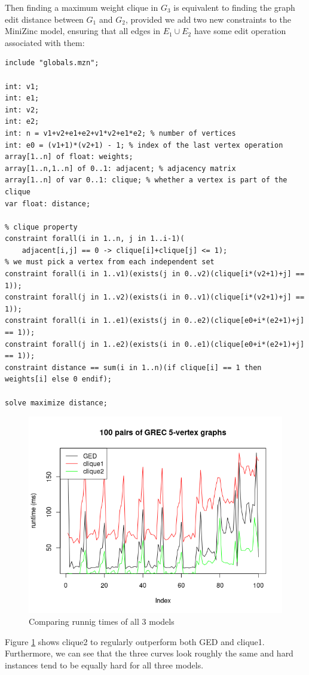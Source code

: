 \documentclass{article}
\theoremstyle{definition}
\begin{document}
Then finding a maximum weight clique in $G_3$ is equivalent to finding the graph edit distance between $G_1$ and $G_2$, provided we add two new constraints to the MiniZinc model, ensuring that all edges in $E_1 \cup E_2$ have some edit operation associated with them:
\begin{lstlisting}
include "globals.mzn";

int: v1;
int: e1;
int: v2;
int: e2;
int: n = v1+v2+e1+e2+v1*v2+e1*e2; % number of vertices
int: e0 = (v1+1)*(v2+1) - 1; % index of the last vertex operation
array[1..n] of float: weights;
array[1..n,1..n] of 0..1: adjacent; % adjacency matrix
array[1..n] of var 0..1: clique; % whether a vertex is part of the clique
var float: distance;

% clique property
constraint forall(i in 1..n, j in 1..i-1)(
    adjacent[i,j] == 0 -> clique[i]+clique[j] <= 1);
% we must pick a vertex from each independent set
constraint forall(i in 1..v1)(exists(j in 0..v2)(clique[i*(v2+1)+j] == 1));
constraint forall(j in 1..v2)(exists(i in 0..v1)(clique[i*(v2+1)+j] == 1));
constraint forall(i in 1..e1)(exists(j in 0..e2)(clique[e0+i*(e2+1)+j] == 1));
constraint forall(j in 1..e2)(exists(i in 0..e1)(clique[e0+i*(e2+1)+j] == 1));
constraint distance == sum(i in 1..n)(if clique[i] == 1 then weights[i] else 0 endif);

solve maximize distance;
\end{lstlisting}
\begin{figure}
  \includegraphics[scale=0.5]{comparison.png}
  \caption{Comparing runnig times of all 3 models}
  \label{fig:comparison3}
\end{figure}
Figure \ref{fig:comparison3} shows clique2 to regularly outperform both GED and clique1. Furthermore, we can see that the three curves look roughly the same and hard instances tend to be equally hard for all three models.
\end{document}
